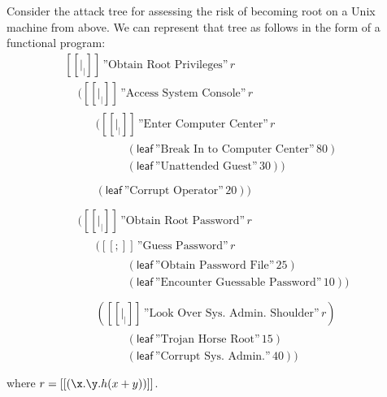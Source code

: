 Consider the attack tree for assessing the risk of becoming root on a
Unix machine from above.  We can represent that tree as follows in the
form of a functional program:
\[
  \begin{array}{lll}
    [[|_|]]\,\text{''Obtain Root Privileges''}\,r\\
    \,\,\,\,\,\,\,([[|_|]]\,\text{''Access System Console''}\,r\\
    \,\,\,\,\,\,\,\,\,\,\,\,\,\,\begin{array}{lll}
    ([[|_|]]\,\text{''Enter Computer Center''}\,r\\
    \,\,\,\,\,\,\,\,\,\,\,\,\,\,\begin{array}{lll}
    (\mathsf{leaf}\,\text{''Break In to Computer Center''}\,80)\\
    (\mathsf{leaf}\,\text{''Unattended Guest''}\,30))\\
    \end{array}\\
    (\mathsf{leaf}\,\text{''Corrupt Operator''}\,20))\\
    \end{array}\\
    \,\,\,\,\,\,\,([[|_|]]\,\text{''Obtain Root Password''}\,r\\
    \,\,\,\,\,\,\,\,\,\,\,\,\,\,\begin{array}{lll}
    ([[;]]\,\text{''Guess Password''}\,r\\
    \,\,\,\,\,\,\,\,\,\,\,\,\,\,\begin{array}{lll}
    (\mathsf{leaf}\,\text{''Obtain Password File''}\,25)\\
    (\mathsf{leaf}\,\text{''Encounter Guessable Password''}\,10))\\
    \end{array}\\
    ([[|_|]]\,\text{''Look Over Sys. Admin. Shoulder''}\,r)\\
    \,\,\,\,\,\,\,\,\,\,\,\,\,\,\begin{array}{lll}
    (\mathsf{leaf}\,\text{''Trojan Horse Root''}\,15)\\
    (\mathsf{leaf}\,\text{''Corrupt Sys. Admin.''}\,40))\\
    \end{array}    
    \end{array}
  \end{array}
\]
where $r = [[(\x.\y.h(x + y))]]$.

